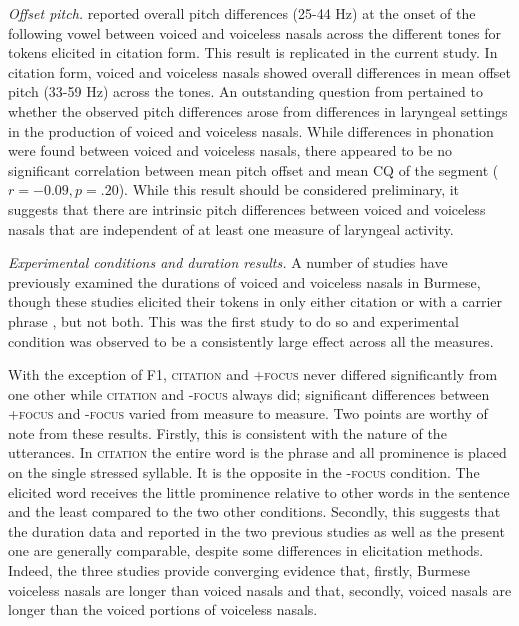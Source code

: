 \documentclass[12pt]{article}
\newcommand{\ipa}[1]{{\fontspec{Times New Roman}#1}}
\newcommand{\condc}{\textsc{citation }}
\newcommand{\condf}{\textsc{+focus }}
\newcommand{\condu}{\textsc{-focus }}
\begin{document}
\emph{Offset pitch.} \citet{maddieson1984tono} reported overall pitch differences (25-44 Hz) at the onset of the following vowel between voiced and voiceless nasals across the different tones for tokens elicited in citation form. This result is replicated in the current study. In citation form, voiced and voiceless nasals showed overall differences in mean offset pitch (33-59 Hz) across the tones. An outstanding question from \citet{maddieson1984tono} pertained to whether the observed pitch differences arose from differences in laryngeal settings in the production of voiced and voiceless nasals. While differences in phonation were found between voiced and voiceless nasals, there appeared to be no significant correlation between mean pitch offset and mean CQ of the segment ($r = -0.09, p = .20$). While this result should be considered preliminary, it suggests that there are intrinsic pitch differences between voiced and voiceless nasals that are independent of at least one measure of laryngeal activity.

\newpage
\emph{Experimental conditions and duration results.} A number of studies have previously examined the durations of voiced and voiceless nasals in Burmese, though these studies elicited their tokens in only either citation \citep[\ipa{/\#NV\#/}][]{dantsuji1984study} or with a carrier phrase \citep[\condf in this study:][]{bhaskararao1991two}, but not both. This was the first study to do so and experimental condition was observed to be a consistently large effect across all the measures.

With the exception of F1, \condc and \condf never differed significantly from one other while \condc and \condu always did; significant differences between \condf and \condu varied from measure to measure. Two points are worthy of note from these results. Firstly, this is consistent with the nature of the utterances. In \condc the entire word is the phrase and all prominence is placed on the single stressed syllable. It is the opposite in the \condu condition. The elicited word receives the little prominence relative to other words in the sentence and the least compared to the two other conditions. Secondly, this suggests that the duration data and reported in the two previous studies as well as the present one are generally comparable, despite some differences in elicitation methods. Indeed, the three studies provide converging evidence that, firstly, Burmese voiceless nasals are longer than voiced nasals and that, secondly, voiced nasals are longer than the voiced portions of voiceless nasals.
\end{document}
